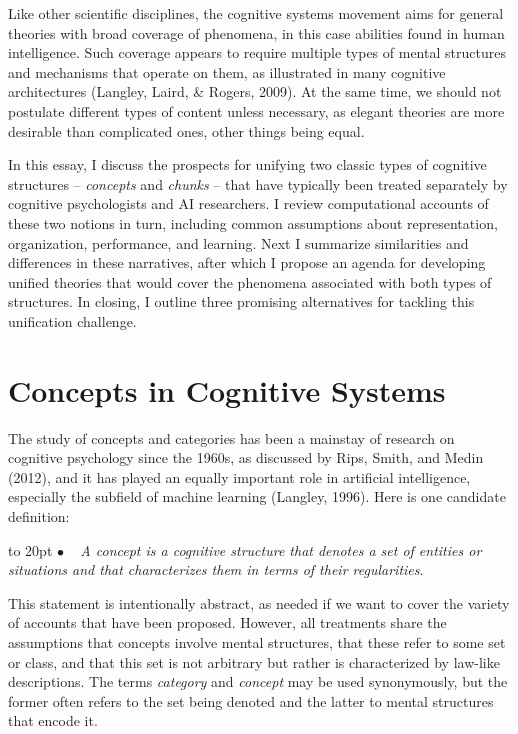 \documentclass[11pt,letterpaper]{article}
\def\texitem#1{\par\noindent\hangindent 20pt
               \hbox to 20pt {\hss #1 ~}\ignorespaces}
\def\bull{\texitem{$\bullet$}}
\begin{document}
Like other scientific disciplines, the cognitive systems movement aims 
for general theories with broad coverage of phenomena, in this case
abilities found in human intelligence. Such coverage appears to require
multiple types of mental structures and mechanisms that operate on them,
as illustrated in many cognitive architectures (Langley, Laird, \&
Rogers, 2009). At the same time, we should not postulate different types 
of content unless necessary, as elegant theories are more desirable than 
complicated ones, other things being equal. 


In this essay, I discuss the prospects for unifying two classic types of
cognitive structures -- {\it concepts\/} and {\it chunks\/} -- that have
typically been treated separately by cognitive psychologists and AI
researchers. I review computational accounts of these two notions in
turn, including common assumptions about representation, organization,
performance, and learning. Next I summarize similarities and differences
in these narratives, after which I propose an agenda for developing unified
theories that would cover the phenomena associated with both types of
structures. In closing, I outline three promising alternatives for
tackling this unification challenge. 

\section{Concepts in Cognitive Systems}


The study of concepts and categories has been a mainstay of research
on cognitive psychology since the 1960s, as discussed by Rips, Smith,
and Medin (2012), and it has played an equally important role in 
artificial intelligence, especially the subfield of machine learning 
(Langley, 1996). Here is one candidate definition:

\vskip 0.05in

\bull
  {\it A concept is a cognitive structure that denotes a set of 
       entities or situations and that characterizes them in terms 
       of their regularities\/}.

\vskip 0.05in
\noindent
This statement is intentionally abstract, as needed if we want to cover 
  the variety of accounts that have been proposed. 
However, all treatments share the assumptions that concepts involve 
  mental structures, that these refer to some set or class, and that 
  this set is not arbitrary but rather is characterized by law-like
  descriptions. 
The terms {\it category\/} and {\it concept\/} may be used synonymously, 
  but the former often refers to the set being denoted and the latter 
  to mental structures that encode it. 
\end{document}
